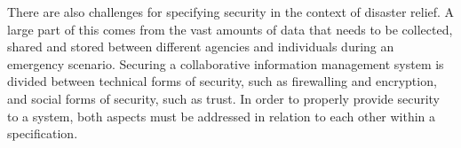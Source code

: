 \documentclass[sigconf,nonacm]{acmart}%
\begin{document}
	There are also challenges for specifying security in the context of disaster relief. A large part of this comes from the vast amounts of data that needs to be collected, shared and stored between different agencies and individuals during an emergency scenario. Securing a collaborative information management system is divided between technical forms of security, such as firewalling and encryption, and social forms of security, such as trust. In order to properly provide security to a system, both aspects must be addressed in relation to each other within a specification. 	
	
\end{document}
